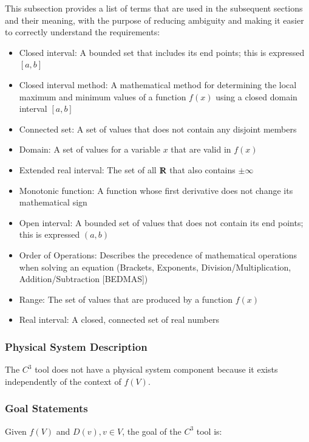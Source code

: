 \documentclass[12pt]{article}
\newcommand{\prognameAbbrv}{$C^{3}$}
\begin{document}
This subsection provides a list of terms that are used in the subsequent
sections and their meaning, with the purpose of reducing ambiguity and making it
easier to correctly understand the requirements:

\begin{itemize}

\item Closed interval: A bounded set that includes its end points; this is 
expressed $[a,b]$
\item Closed interval method: A mathematical method for determining the local 
maximum and minimum values of a function $f(x)$ using a closed domain interval 
$[a,b]$
\item Connected set: A set of values that does not contain any disjoint members
\item Domain: A set of values for a variable $x$ that are valid in $f(x)$
\item Extended real interval: The set of all $\varmathbb{R}$ that also contains 
$\pm \infty$
\item Monotonic function: A function whose first derivative does not change its 
mathematical sign
\item Open interval: A bounded set of values that does not contain its end 
points; this is expressed $(a,b)$
\item Order of Operations: Describes the precedence of mathematical operations 
when solving an equation (Brackets, Exponents, Division/Multiplication, 
Addition/Subtraction [BEDMAS])
\item Range: The set of values that are produced by a function $f(x)$
\item Real interval: A closed, connected set of real numbers

\end{itemize}

\subsubsection{Physical System Description}

The \prognameAbbrv{} tool does not have a physical system component because it 
exists independently of the context of $f(V)$. 

\subsubsection{Goal Statements}

\noindent Given $f(V)$ and $D(v), v \in V$, the goal of the \prognameAbbrv{} 
tool is:
\end{document}
